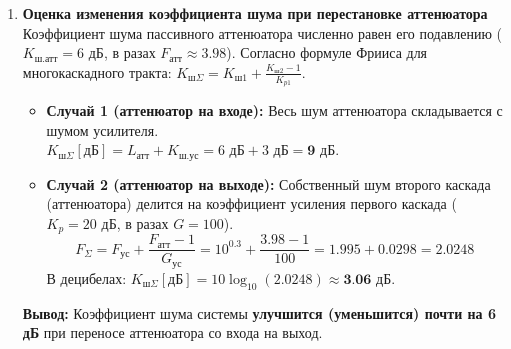 \documentclass[11pt, a4paper]{article}
\begin{document}
\begin{enumerate}[label=\textbf{\arabic*.}]
    \item \textbf{Оценка изменения коэффициента шума при перестановке аттенюатора}\\
    Коэффициент шума пассивного аттенюатора численно равен его подавлению ($K_{\text{ш.атт}} = 6 \text{ дБ}$, в разах $F_{\text{атт}} \approx 3.98$). Согласно формуле Фрииса для многокаскадного тракта: $K_{\text{ш}\Sigma} = K_{\text{ш}1} + \frac{K_{\text{ш}2} - 1}{K_{p1}}$.
    \begin{itemize}
        \item \textbf{Случай 1 (аттенюатор на входе):} Весь шум аттенюатора складывается с шумом усилителя. \\ $K_{\text{ш}\Sigma}[\text{дБ}] = L_{\text{атт}} + K_{\text{ш.ус}} = 6 \text{ дБ} + 3 \text{ дБ} = \textbf{9 дБ}$.
        \item \textbf{Случай 2 (аттенюатор на выходе):} Собственный шум второго каскада (аттенюатора) делится на коэффициент усиления первого каскада ($K_{p} = 20 \text{ дБ}$, в разах $G = 100$). 
        \begin{equation*}
            F_{\Sigma} = F_{\text{ус}} + \frac{F_{\text{атт}} - 1}{G_{\text{ус}}} = 10^{0.3} + \frac{3.98 - 1}{100} = 1.995 + 0.0298 = 2.0248
        \end{equation*}
        В децибелах: $K_{\text{ш}\Sigma}[\text{дБ}] = 10\log_{10}(2.0248) \approx \textbf{3.06 дБ}$.
    \end{itemize}
    \textbf{Вывод:} Коэффициент шума системы \textbf{улучшится (уменьшится) почти на 6 дБ} при переносе аттенюатора со входа на выход.

\end{enumerate}
\end{document}
